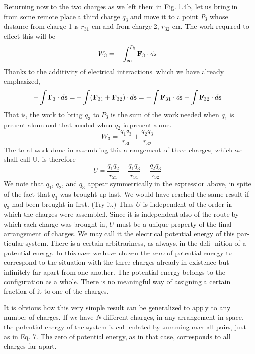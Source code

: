 Returning now to the two charges as we left them in Fig. 1.4b, let
us bring in from some remote place a third charge $q_3$ and move it to a
point $P_3$ whose distance from charge 1 is $r_{31}$ cm and from charge 2,
$r_{32}$ cm. The work required to effect this will be
\begin{equation}
  W_3 = -\int_\infty^{P_3} \mathbf{F}_3\cdot d\mathbf{s}
\end{equation}
Thanks to the additivity of electrical interactions, which we have
already emphasized,
\begin{equation}
  -\int \mathbf{F}_3\cdot d\mathbf{s} = - \int (\mathbf{F}_{31}+\mathbf{F}_{32})\cdot d\mathbf{s}
  = -\int \mathbf{F}_{31}\cdot d\mathbf{s} -\int \mathbf{F}_{32}\cdot d\mathbf{s}
\end{equation}
That is, the work to bring $q_3$ to $P_3$ is the sum of the work needed when
$q_1$ is present alone and that needed when $q_2$ is present alone.
\begin{equation}
  W_3 = \frac{q_1q_3}{r_{31}}+\frac{q_2q_3}{r_{32}}
\end{equation}
The total work done in assembling this arrangement of three charges,
which we shall call U, is therefore
\begin{equation}
  U = \frac{q_1q_2}{r_{21}}+\frac{q_1q_3}{r_{31}}+\frac{q_2q_3}{r_{32}}
\end{equation}
We note that $q_1$, $q_2$, and $q_3$ appear symmetrically in the expression
above, in spite of the fact that $q_3$ was brought up last. We would have
reached the same result if $q_3$ had been brought in first. (Try it.)
Thus $U$ is independent of the order in which the charges were assembled.
Since it is independent also of the route by which each charge
was brought in, $U$ must be a unique property of the final arrangement
of charges. We may call it the electrical potential energy of this par-
ticular system. There is a certain arbitrariness, as always, in the defi-
nition of a potential energy. In this case we have chosen the zero
of potential energy to correspond to the situation with the three
charges already in existence but infinitely far apart from one another.
The potential energy belongs to the configuration as a whole. There
is no meaningful way of assigning a certain fraction of it to one of the
charges.

It is obvious how this very simple result can be generalized to
apply to any number of charges. If we have $N$ different charges, in
any arrangement in space, the potential energy of the system is cal-
culated by summing over all pairs, just as in Eq. 7. The zero of
potential energy, as in that case, corresponds to all charges far apart.

